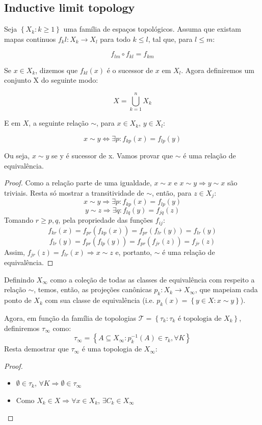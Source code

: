 \subsection{Inductive limit topology}

Seja $\left\{X_k:k\geq1\right\}$ uma família de espaços topológicos. Assuma que existam mapas continuos $f_kl:X_k\to X_l$ para todo $k\leq l$, tal que, para $l\leq m$:

\[f_{lm}\circ f_{kl} = f_{km}\]

Se $x\in X_k$, dizemos que $f_{kl}(x)$ é o sucessor de $x$ em $X_l$. Agora definiremos um conjunto X do seguinte modo:

\[X=\bigcup_{k=1}^{n}X_k\]

E em $X$, a seguinte relação $\sim$, para $x\in X_k$, $y\in X_l$:

\[x\sim y\Leftrightarrow \exists p: f_{kp}(x) = f_{lp}(y)\] 

Ou seja, $x\sim y$ se y é sucessor de x. Vamos provar que $\sim$ é uma relação de equivalência.
\begin{proof}

    Como a relação parte de uma igualdade, $x\sim x$ e $x\sim y \Rightarrow y\sim x$ são triviais. Resta só mostrar a transitividade de $\sim$, então, para $z\in X_j$:
    \[x\sim y \Rightarrow\exists p: f_{kp}(x) = f_{lp}(y)\]
    \[y\sim z \Rightarrow\exists q: f_{lq}(y) = f_{jq}(z)\]
    Tomando $r \geq p,q$, pela propriedade das funções $f_{ij}$: 
    \[f_{kr}(x)=f_{pr}(f_{kp}(x))=f_{pr}(f_{lr}(y))=f_{lr}(y)\]
    \[f_{lr}(y)=f_{pr}(f_{lp}(y))=f_{pr}(f_{jr}(z))=f_{jr}(z)\]
    Assim, $f_{jr}(z)=f_{lr}(x)\Rightarrow x\sim z$ e, portanto, $\sim$ é uma relação de equivalência.

\end{proof}

Definindo $X_{\infty}$ como a coleção de todas as classes de equivalência com respeito a relação $\sim$, temos, então, as projeções canônicas $p_k:X_k\to X_{\infty}$, que mapeiam cada ponto de $X_k$ com sua classe de equivalência (i.e. $p_k(x)=\left\{y\in X: x\sim y\right\}$). 

Agora, em função da família de topologias $\mathcal{T}=\left\{\tau_k:\tau_k \text{ é topologia de } X_k\right\}$, definiremos $\tau_\infty$ como: 
\[\tau_\infty = \left\{A\subseteq X_\infty:p_{k}^{-1}(A)\in\tau_k, \forall K\right\}\]
Resta demostrar que $\tau_\infty$ é uma topologia de $X_\infty$:

\begin{proof}
    \begin{itemize}
        \item $\emptyset\in\tau_k$, $\forall K\Rightarrow \emptyset\in\tau_\infty$
        \item Como $X_k\in X\Rightarrow\forall x\in X_k$, $\exists C_k \in X_\infty$
    \end{itemize}

\end{proof}




